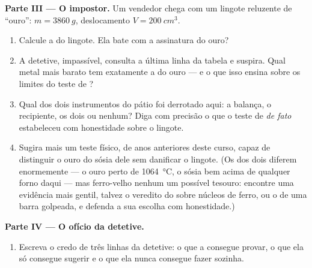 \begin{problem}
\medskip\noindent\textbf{Parte III --- O impostor.}
Um vendedor chega com um lingote reluzente de ``ouro'':
$m = \qty{3860}{g}$, deslocamento $V = \qty{200}{cm^3}$.
\begin{enumerate}[resume]
  \item Calcule a  do lingote. Ela bate com a assinatura do
        ouro?
  \item A detetive, impassível, consulta a última linha da tabela e
        suspira. Qual metal mais barato tem exatamente a  do
        ouro --- e o que isso ensina sobre os limites do teste de
        ?
  \item Qual dos dois instrumentos do pátio foi derrotado aqui: a
        balança, o recipiente, os dois ou nenhum? Diga com precisão o
        que o teste de  \emph{de fato} estabeleceu com
        honestidade sobre o lingote.
  \item Sugira mais um teste físico, de anos anteriores deste curso,
        capaz de distinguir o ouro do sósia dele sem danificar o
        lingote. (Os  dos dois diferem enormemente ---
        o ouro perto de \qty{1064}{\celsius}, o sósia bem acima de
        qualquer forno daqui --- mas ferro-velho nenhum  um
        possível tesouro: encontre uma evidência mais gentil, talvez
        o veredito do  sobre núcleos de ferro, ou o  de uma
        barra golpeada, e defenda a sua escolha com honestidade.)
\end{enumerate}

\medskip\noindent\textbf{Parte IV --- O ofício da detetive.}
\begin{enumerate}[resume]
  \item Escreva o credo de três linhas da detetive: o que a 
        consegue provar, o que ela só consegue sugerir e o que ela
        nunca consegue fazer sozinha.
\end{enumerate}
\end{problem}

